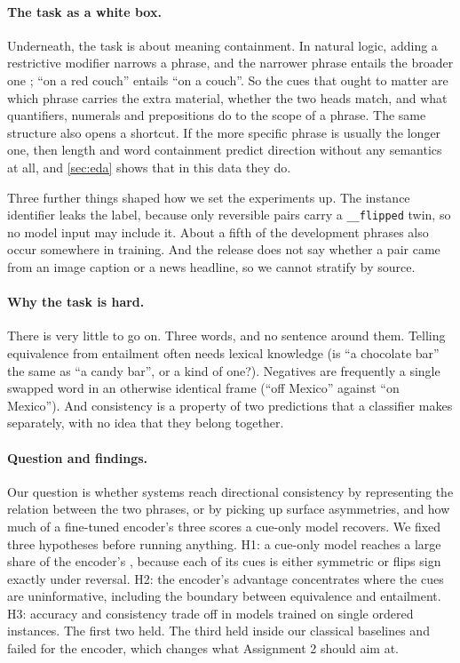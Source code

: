 \paragraph{The task as a white box.}
Underneath, the task is about meaning containment. In natural logic, adding a restrictive modifier narrows a phrase, and the narrower phrase entails the broader one \citep{maccartney-manning-2009-extended}; ``on a red couch'' entails ``on a couch''. So the cues that ought to matter are which phrase carries the extra material, whether the two heads match, and what quantifiers, numerals and prepositions do to the scope of a phrase. The same structure also opens a shortcut. If the more specific phrase is usually the longer one, then length and word containment predict direction without any semantics at all, and \cref{sec:eda} shows that in this data they do.

Three further things shaped how we set the experiments up. The instance identifier leaks the label, because only reversible pairs carry a \texttt{\_\_flipped} twin, so no model input may include it. About a fifth of the development phrases also occur somewhere in training. And the release does not say whether a pair came from an image caption or a news headline, so we cannot stratify by source.

\paragraph{Why the task is hard.}
There is very little to go on. Three words, and no sentence around them. Telling equivalence from entailment often needs lexical knowledge (is ``a chocolate bar'' the same as ``a candy bar'', or a kind of one?). Negatives are frequently a single swapped word in an otherwise identical frame (``off Mexico'' against ``on Mexico''). And consistency is a property of two predictions that a classifier makes separately, with no idea that they belong together.

\paragraph{Question and findings.}
Our question is whether systems reach directional consistency by representing the relation between the two phrases, or by picking up surface asymmetries, and how much of a fine-tuned encoder's three scores a cue-only model recovers. We fixed three hypotheses before running anything. H1: a cue-only model reaches a large share of the encoder's \SoftCons{}, because each of its cues is either symmetric or flips sign exactly under reversal. H2: the encoder's advantage concentrates where the cues are uninformative, including the boundary between equivalence and entailment. H3: accuracy and consistency trade off in models trained on single ordered instances. The first two held. The third held inside our classical baselines and failed for the encoder, which changes what Assignment 2 should aim at.
